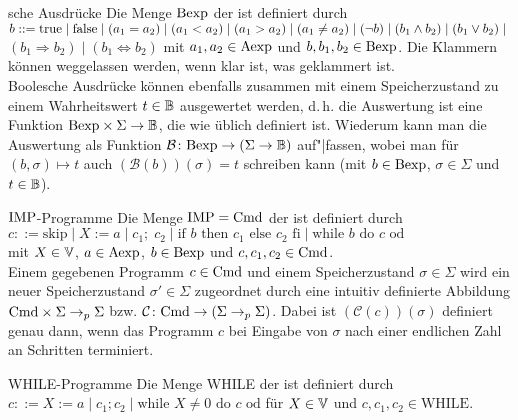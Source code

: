 \begin{Def}{sche Ausdrücke}
    Die Menge $\text{Bexp}$ der  ist definiert durch
    $b ::= \text{true} \;|\; \text{false} \;|\; (a_1 = a_2) \;|\; (a_1 < a_2) \;|\; (a_1 > a_2) \;|\;
    (a_1 \not= a_2) \;|\; (\lnot b) \;|\; (b_1 \land b_2) \;|\; (b_1 \lor b_2) \;|\;$\\
    $(b_1 \Rightarrow b_2) \;|\; (b_1 \Leftrightarrow b_2)$
    mit $a_1, a_2 \in \text{Aexp}$ und $b, b_1, b_2 \in \text{Bexp}$.
    Die Klammern können weggelassen werden, wenn klar ist, was geklammert ist.\\
    Boolesche Ausdrücke können ebenfalls zusammen mit einem Speicherzustand zu einem
    Wahrheitswert $t \in \mathbb{B}$ ausgewertet werden, d.\,h. die Auswertung ist eine Funktion
    $\text{Bexp} \times \Sigma \rightarrow \mathbb{B}$, die wie üblich definiert ist.
    Wiederum kann man die Auswertung als Funktion
    $\mathcal{B}\colon \text{Bexp} \rightarrow (\Sigma \rightarrow \mathbb{B})$ auf"|fassen,
    wobei man für $(b, \sigma) \mapsto t$ auch $(\mathcal{B}(b))(\sigma) = t$ schreiben kann
    (mit $b \in \text{Bexp}$, $\sigma \in \Sigma$ und $t \in \mathbb{B}$).
\end{Def}

\begin{Def}{$\text{IMP}$-Programme}
    Die Menge $\text{IMP} = \text{Cmd}$ der  ist definiert durch\\
    $c ::= \text{skip} \;|\; X := a \;|\; c_1;\; c_2 \;|\;
    \text{if } b \text{ then } c_1 \text{ else } c_2 \text{ fi} \;|\;
    \text{while } b \text{ do } c \text{ od}$\\
    mit $X \in \mathbb{V}$, $a \in \text{Aexp}$, $b \in \text{Bexp}$ und $c, c_1, c_2 \in \text{Cmd}$.\\
    Einem gegebenen Programm $c \in \text{Cmd}$ und einem Speicherzustand $\sigma \in \Sigma$ wird
    ein neuer Speicherzustand $\sigma' \in \Sigma$ zugeordnet durch eine intuitiv definierte
    Abbildung $\text{Cmd} \times \Sigma \rightarrow_p \Sigma$ bzw.
    $\mathcal{C}\colon \text{Cmd} \rightarrow (\Sigma \rightarrow_p \Sigma)$.
    Dabei ist $(\mathcal{C}(c))(\sigma)$ definiert genau dann,
    wenn das Programm $c$ bei Eingabe von $\sigma$
    nach einer endlichen Zahl an Schritten terminiert.
\end{Def}

\linie

\begin{Def}{WHILE-Programme}
    Die Menge WHILE der  ist definiert durch\\
    $c ::= X := a \;|\; c_1; c_2 \;|\; \text{while } X \not= 0 \text{ do } c \text{ od}$
    für $X \in \mathbb{V}$ und $c, c_1, c_2 \in \text{WHILE}$.
\end{Def}

